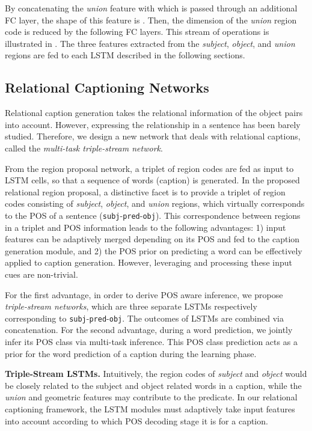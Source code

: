 \documentclass[10pt,twocolumn,letterpaper]{article}
\begin{document}
By concatenating the \emph{union} feature with  which is passed through an additional FC layer, the shape of this feature is .
Then, the dimension of the \emph{union} region code is reduced by the following FC layers.
This stream of operations is illustrated in .
The three features extracted from the \emph{subject}, \emph{object}, and \emph{union} regions are fed to each LSTM described in the following sections.



\subsection{Relational Captioning Networks }
Relational caption generation takes the {relational information of the object pairs} into account.
{However, expressing the relationship in a sentence has been barely studied.}
Therefore, we design a new network that deals with relational captions, called the \emph{multi-task triple-stream network}.





From the region proposal network, a triplet of region codes are fed as input to LSTM cells, so that a sequence of words (caption) is generated.
In the proposed relational region proposal, a distinctive facet is to provide a triplet of region codes consisting of \emph{subject}, \emph{object}, and \emph{union} regions, which virtually corresponds to the POS of a sentence  (\texttt{subj}-\texttt{pred}-\texttt{obj}).
This correspondence between regions in a triplet and POS information leads to the following advantages: 1) input features can be {adaptively merged} depending on its POS and fed to the caption generation module, and 2) the POS prior on predicting a word can be effectively applied to caption generation.
However, leveraging and processing these input cues are non-trivial.




For the first advantage, in order to derive POS aware inference, we propose \emph{triple-stream networks}, which are three separate LSTMs respectively corresponding to \texttt{subj}-\texttt{pred}-\texttt{obj}. 
The outcomes of LSTMs are combined via concatenation.
For the second advantage, during a word prediction, we jointly infer its POS class via multi-task inference.
This POS class prediction acts as a prior for the word prediction of a caption during the learning phase.




\vspace{1mm}\noindent\textbf{Triple-Stream LSTMs.}\quad
Intuitively, the region codes of \emph{subject} and \emph{object} would be closely related to the subject and object related words in a caption, while the \emph{union} and geometric features may contribute to the predicate.
In our relational captioning framework, the LSTM modules must adaptively take input features into account according to which POS decoding stage it is for a caption.
\end{document}

